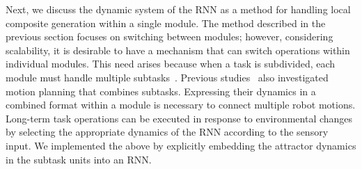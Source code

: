 Next, we discuss the dynamic system of the RNN as a method for handling local composite generation within a single module. The method described in the previous section focuses on switching between modules; however, considering scalability, it is desirable to have a mechanism that can switch operations within individual modules. This need arises because when a task is subdivided, each module must handle multiple subtasks~\cite{Nair2019iclr,Yu2019iros}. Previous studies~\cite{Yin2021iclr,Garrett2021cras} also investigated motion planning that combines subtasks. Expressing their dynamics in a combined format within a module is necessary to connect multiple robot motions. Long-term task operations can be executed in response to environmental changes by selecting the appropriate dynamics of the RNN according to the sensory input. We implemented the above by explicitly embedding the attractor dynamics in the subtask units into an RNN.



